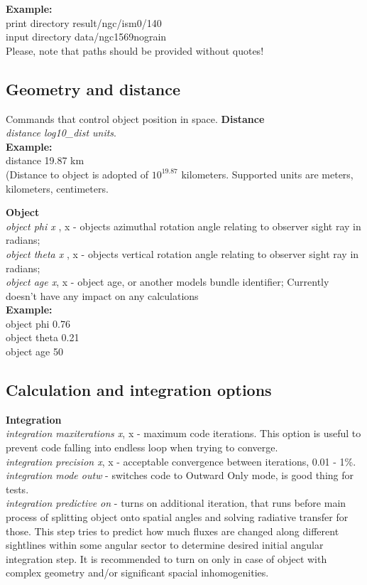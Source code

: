 \documentclass[a4paper]{article}
\begin{document}
{\bf Example:}\\
print directory result/ngc/ism0/140\\
input directory data/ngc1569nograin\\
Please, note that paths should be provided without quotes!\\

\subsection{Geometry and distance}
Commands that control object position in space.
{\bf Distance}\\
{\it distance log10\_dist units}.\\

{\bf Example:}\\
distance 19.87 km \\
(Distance to object is adopted of $10^{19.87}$ kilometers.
Supported units are meters, kilometers, centimeters.

{\bf Object}\\
{\it object phi x} , x - objects azimuthal rotation angle relating to observer sight ray in radians;\\
{\it object theta x} , x - objects vertical rotation angle relating to observer sight ray in radians;\\
{\it object age x}, x - object age, or another models bundle identifier; Currently doesn't have any impact on any calculations\\

{\bf Example:}\\
object phi 0.76\\
object theta 0.21\\
object age 50\\

\subsection{Calculation and integration options}
{\bf Integration}\\
{\it integration maxiterations x}, x - maximum code iterations. This option is useful to prevent code
falling into endless loop when trying to converge.\\
{\it integration precision x}, x - acceptable convergence between iterations, 0.01 - 1\%. \\
{\it integration mode outw} - switches code to Outward Only mode, is good thing for tests.\\
{\it integration predictive on} - turns on additional iteration, that runs before main process of splitting object onto spatial angles and solving
radiative transfer for those. This step tries to predict how much fluxes are changed along different sightlines within some angular sector
to determine desired initial angular integration step. It is recommended to turn on only in case of object with complex geometry and/or
significant spacial inhomogenities.
\end{document}
